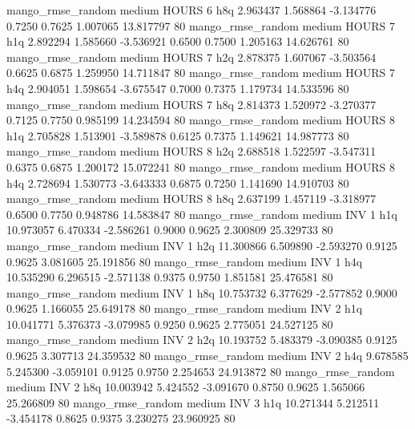 mango_rmse_random     medium    HOURS                 6                  h8q  2.963437 1.568864 -3.134776 0.7250 0.7625  1.007065   13.817797 80
mango_rmse_random     medium    HOURS                 7                  h1q  2.892294 1.585660 -3.536921 0.6500 0.7500  1.205163   14.626761 80
mango_rmse_random     medium    HOURS                 7                  h2q  2.878375 1.607067 -3.503564 0.6625 0.6875  1.259950   14.711847 80
mango_rmse_random     medium    HOURS                 7                  h4q  2.904051 1.598654 -3.675547 0.7000 0.7375  1.179734   14.533596 80
mango_rmse_random     medium    HOURS                 7                  h8q  2.814373 1.520972 -3.270377 0.7125 0.7750  0.985199   14.234594 80
mango_rmse_random     medium    HOURS                 8                  h1q  2.705828 1.513901 -3.589878 0.6125 0.7375  1.149621   14.987773 80
mango_rmse_random     medium    HOURS                 8                  h2q  2.688518 1.522597 -3.547311 0.6375 0.6875  1.200172   15.072241 80
mango_rmse_random     medium    HOURS                 8                  h4q  2.728694 1.530773 -3.643333 0.6875 0.7250  1.141690   14.910703 80
mango_rmse_random     medium    HOURS                 8                  h8q  2.637199 1.457119 -3.318977 0.6500 0.7750  0.948786   14.583847 80
mango_rmse_random     medium      INV                 1                  h1q 10.973057 6.470334 -2.586261 0.9000 0.9625  2.300809   25.329733 80
mango_rmse_random     medium      INV                 1                  h2q 11.300866 6.509890 -2.593270 0.9125 0.9625  3.081605   25.191856 80
mango_rmse_random     medium      INV                 1                  h4q 10.535290 6.296515 -2.571138 0.9375 0.9750  1.851581   25.476581 80
mango_rmse_random     medium      INV                 1                  h8q 10.753732 6.377629 -2.577852 0.9000 0.9625  1.166055   25.649178 80
mango_rmse_random     medium      INV                 2                  h1q 10.041771 5.376373 -3.079985 0.9250 0.9625  2.775051   24.527125 80
mango_rmse_random     medium      INV                 2                  h2q 10.193752 5.483379 -3.090385 0.9125 0.9625  3.307713   24.359532 80
mango_rmse_random     medium      INV                 2                  h4q  9.678585 5.245300 -3.059101 0.9125 0.9750  2.254653   24.913872 80
mango_rmse_random     medium      INV                 2                  h8q 10.003942 5.424552 -3.091670 0.8750 0.9625  1.565066   25.266809 80
mango_rmse_random     medium      INV                 3                  h1q 10.271344 5.212511 -3.454178 0.8625 0.9375  3.230275   23.960925 80
